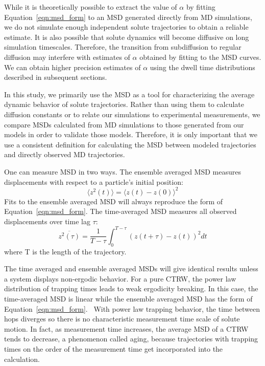 \documentclass[journal=jctcce,manuscript=article]{achemso}
\begin{document}
  While it is theoretically possible to extract the value of $\alpha$ by fitting
  Equation~\ref{eqn:msd_form} to an MSD generated directly from MD simulations, 
  we do not simulate enough independent solute trajectories to obtain a reliable
  estimate. It is also possible that solute dynamics will become diffusive on
  long simulation timescales. Therefore, the transition from subdiffusion to regular
  diffusion may interfere with estimates of $\alpha$ obtained by fitting to the MSD curves. 
  We can obtain higher precision estimates of $\alpha$ using the dwell
  time distributions described in subsequent sections.

  In this study, we primarily use the MSD as a tool for characterizing the average
  dynamic behavior of solute trajectories. Rather than using them to calculate 
  diffusion constants or to relate our simulations to experimental measurements, we
  compare MSDs calculated from MD simulations to those generated from our models 
  in order to validate those models. Therefore, it is only important that we use a
  consistent definition for calculating the MSD between modeled trajectories and
  directly observed MD trajectories.

  One can measure MSD in two ways. The ensemble averaged MSD measures 
  displacements with respect to a particle's initial position:
  \begin{equation}
  \langle z^2(t) \rangle = \langle z(t) - z(0) \rangle^2
  \label{eqn:ensemble_msd}
  \end{equation}
  Fits to the ensemble averaged MSD will always reproduce the form of 
  Equation~\ref{eqn:msd_form}. The time-averaged MSD measures all observed 
  displacements over time lag $\tau$: 
  \begin{equation}
  \overline{z^2(\tau)} = \dfrac{1}{T - \tau}\int_{0}^{T - \tau} (z(t + \tau) - z(t))^2 dt
  \label{eqn:tamsd}
  \end{equation}
  where T is the length of the trajectory. 
  
  The time averaged and ensemble averaged MSDs will give identical results 
  unless a system displays non-ergodic behavior. For a pure CTRW, the power 
  law distribution of trapping times leads to weak ergodicity breaking.
  In this case, the time-averaged MSD is linear while the ensemble averaged
  MSD has the form of Equation~\ref{eqn:msd_form}.~\cite{meroz_toolbox_2015} With
  power law trapping behavior, the time between hops diverges so there is no 
  characteristic measurement time scale of solute motion. In fact, as measurement 
  time increases, the average MSD of a CTRW tends to decrease, a phenomenon called
  aging, because trajectories with trapping times on the order of the measurement 
  time get incorporated into the calculation.~\cite{bel_weak_2005}
  
\end{document}
